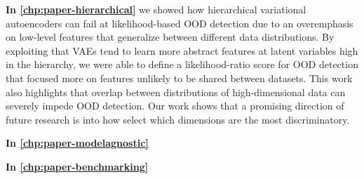 \textbf{In \cref{chp:paper-hierarchical}} we showed how hierarchical variational autoencoders can fail at likelihood-based OOD detection due to an overemphasis on low-level features that generalize between different data distributions. By exploiting that VAEs tend to learn more abstract features at latent variables high in the hierarchy, we were able to define a likelihood-ratio score for OOD detection that focused more on features unlikely to be shared between datasets. 
This work also highlights that overlap between distributions of high-dimensional data can severely impede OOD detection. Our work shows that a promising direction of future research is into how select which dimensions are the most discriminatory.


\vspace{3em}
\textbf{In \cref{chp:paper-modelagnostic}} 

\vspace{3em}
\textbf{In \cref{chp:paper-benchmarking}} 

